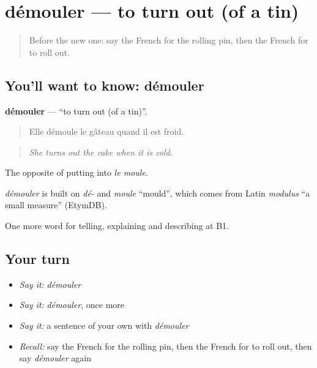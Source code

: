 \section[démouler]{démouler — to turn out (of a tin)}

\label{lesson:FR-C333-demouler}



\begin{quote}
Before the new one: say the French for the rolling pin, then the French for to roll out.
\end{quote}

\subsection*{You'll want to know: démouler}
\textbf{démouler} — \textquotedblleft{}to turn out (of a tin)\textquotedblright{}.

\begin{quote}
Elle démoule le gâteau quand il est froid.
\end{quote}

\begin{quote}
\emph{She turns out the cake when it is cold.}
\end{quote}

The opposite of putting into \emph{le moule}.

\begin{cousinweb}
\emph{démouler} is built on \emph{dé-} and \emph{moule} \textquotedblleft{}mould\textquotedblright{}, which comes from Latin \emph{modulus} \textquotedblleft{}a small measure\textquotedblright{} (EtymDB).
\end{cousinweb}

\begin{grammarlens}[title={What you've built}]
One more word for telling, explaining and describing at B1.
\end{grammarlens}

\subsection*{Your turn}
\begin{itemize}
\raggedright
  \item \emph{Say it:} \emph{démouler}
  \item \emph{Say it:} \emph{démouler}, once more
  \item \emph{Say it:} a sentence of your own with \emph{démouler}
  \item \emph{Recall:} say the French for the rolling pin, then the French for to roll out, then say \emph{démouler} again
\end{itemize}

